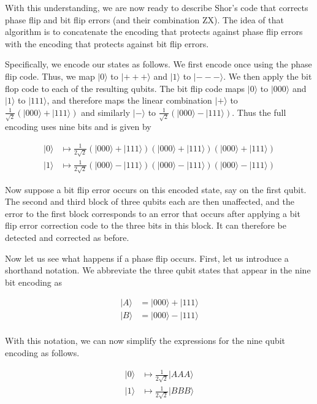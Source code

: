 \documentclass[a4paper, draft]{article}
\theoremstyle{own}
\theoremstyle{remark}
\begin{document}
With this understanding, we are now ready to describe Shor's code that corrects phase flip and bit flip errors (and their combination ZX). The idea of that algorithm is to concatenate the encoding that protects against phase flip errors with the encoding that protects against bit flip errors. 

Specifically, we encode our states as follows. We first encode once using the phase flip code. Thus, we map $|0 \rangle $ to $|+++\rangle$ and $|1 \rangle $ to $|--- \rangle$. We then apply the bit flop code to each of the resulting qubits. The bit flip code maps $|0 \rangle$ to $|000 \rangle$ and $|1 \rangle$ to $|111 \rangle$, and therefore maps the linear combination $|+\rangle $ to $\frac{1}{\sqrt{2}} (|000 \rangle + |111 \rangle)$ and similarly $|-\rangle $ to $\frac{1}{\sqrt{2}} (|000 \rangle - |111 \rangle)$. Thus the full encoding uses nine bits and is given by

\begin{align*}
|0 \rangle &\mapsto \frac{1}{2\sqrt{2}} (|000 \rangle + |111 \rangle) (|000 \rangle + |111 \rangle) (|000 \rangle + |111 \rangle) \\
|1 \rangle &\mapsto \frac{1}{2\sqrt{2}} (|000 \rangle - |111 \rangle) (|000 \rangle - |111 \rangle) (|000 \rangle - |111 \rangle)
\end{align*}

Now suppose a bit flip error occurs on this encoded state, say on the first qubit. The second and third block of three qubits each are then unaffected, and the error to the first block corresponds to an error that occurs after applying a bit flip error correction code to the three bits in this block. It can therefore be detected and corrected as before.

Now let us see what happens if a phase flip occurs. First, let us introduce a shorthand notation. We abbreviate the three qubit states that appear in the nine bit encoding as

\begin{align*}
|A \rangle &= |000 \rangle + |111 \rangle \\
|B \rangle &= |000 \rangle - |111 \rangle \\
\end{align*}

With this notation, we can now simplify the expressions for the nine qubit encoding as follows.

\begin{align*}
|0 \rangle &\mapsto \frac{1}{2\sqrt{2}} |AAA \rangle \\
|1 \rangle &\mapsto \frac{1}{2\sqrt{2}} |BBB \rangle
\end{align*}
\end{document}
